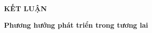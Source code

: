\begin{center}
  \textbf{\fontsize{20}{24}\selectfont KẾT LUẬN}
\end{center}



\hspace{-1cm}\textbf{Phương hướng phát triển trong tương lai}


